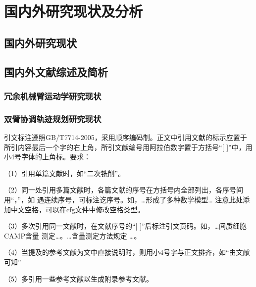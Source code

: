 
\chapter{国内外研究现状及分析}

\section{国内外研究现状}

\section{国内外文献综述及简析}

\subsection{冗余机械臂运动学研究现状}

\subsection{双臂协调轨迹规划研究现状}

引文标注遵照GB/T7714-2005，采用顺序编码制。正文中引用文献的标示应置于所引内容最后一个字的右上角，所引文献编号用阿拉伯数字置于方括号“[ ]”中，用小4号字体的上角标。要求：

（1）引用单篇文献时，如“二次铣削\cite{ren2010}”。

（2）同一处引用多篇文献时，各篇文献的序号在方括号内全部列出，各序号间用“，”，如
遇连续序号，可标注讫序号。如，…形成了多种数学模型\cite{Gravagne2003,ren2010}…
注意此处添加中文空格，可以在cfg文件中修改空格类型。

（3）多次引用同一文献时，在文献序号的“[ ]”后标注引文页码。如，…间质细胞CAMP含量
测定\cite[100-197]{Gravagne2003}…。…含量测定方法规定
\cite[92]{Gravagne2003}…。

（4）当提及的参考文献为文中直接说明时，则用小4号字与正文排齐，如“由文献可知”

（5）多\cite{liu2016}引\cite{fu2018}用\cite{zhai2015}一\cite{yao2015}些\cite{jones2006}参\cite{mcmahan2005}考\cite{jones2004}文献以生成附录参考文献。
